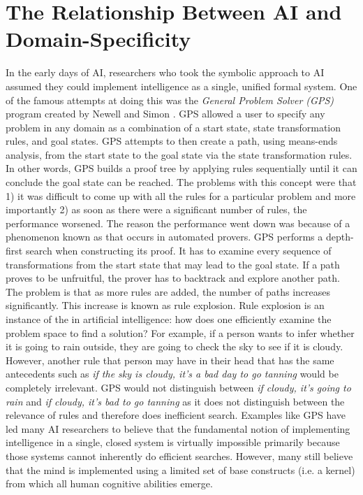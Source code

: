\section{The Relationship Between AI and Domain-Specificity}
In the early days of AI, researchers who took the symbolic approach to AI assumed they could implement intelligence as a single, unified formal system. One of the famous attempts at doing this was the \textit{General Problem Solver (GPS)} program created by Newell and Simon \citep{newell:gps}. GPS allowed a user to specify any problem in any domain as a combination of a start state, state transformation rules, and goal states. GPS attempts to then create a path, using means-ends analysis, from the start state to the goal state via the state transformation rules. In other words, GPS builds a proof tree by applying rules sequentially until it can conclude the goal state can be reached. The problems with this concept were that 1) it was difficult to come up with all the rules for a particular problem and more importantly 2) as soon as there were a significant number of rules, the performance worsened.  The reason the performance went down was because of a phenomenon known as  that occurs in automated provers. GPS performs a depth-first search when constructing its proof. It has to examine every sequence of transformations from the start state that may lead to the goal state. If a path proves to be unfruitful, the prover has to backtrack and explore another path. The problem is that as more rules are added, the number of paths increases significantly. This increase is known as rule explosion. Rule explosion is an instance of the  in artificial intelligence: how does one efficiently examine the problem space to find a solution? For example, if a person wants to infer whether it is going to rain outside, they are going to check the sky to see if it is cloudy. However, another rule that person may have in their head that has the same antecedents such as \textit{if the sky is cloudy, it's a bad day to go tanning} would be completely irrelevant. GPS would not distinguish between \textit{if cloudy, it's going to rain} and \textit{if cloudy, it's bad to go tanning} as it does not distinguish between the relevance of rules and therefore does inefficient search. Examples like GPS have led many AI researchers to believe that the fundamental notion of implementing intelligence in a single, closed system is virtually impossible primarily because those systems cannot inherently do efficient searches. However, many still believe that the mind is implemented using a limited set of base constructs (i.e. a kernel) from which all human cognitive abilities emerge.

